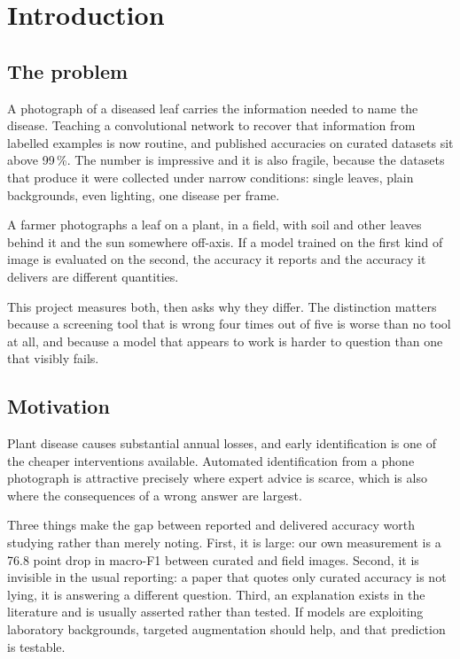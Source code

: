 
\chapter{Introduction}

\section{The problem}

A photograph of a diseased leaf carries the information needed to name the disease.
Teaching a convolutional network to recover that information from labelled examples
is now routine, and published accuracies on curated datasets sit above 99\,\%. The
number is impressive and it is also fragile, because the datasets that produce it
were collected under narrow conditions: single leaves, plain backgrounds, even
lighting, one disease per frame.

A farmer photographs a leaf on a plant, in a field, with soil and other leaves
behind it and the sun somewhere off-axis. If a model trained on the first kind of
image is evaluated on the second, the accuracy it reports and the accuracy it
delivers are different quantities.

This project measures both, then asks why they differ. The distinction matters
because a screening tool that is wrong four times out of five is worse than no tool
at all, and because a model that appears to work is harder to question than one that
visibly fails.

\section{Motivation}

Plant disease causes substantial annual losses, and early identification is one of
the cheaper interventions available. Automated identification from a phone
photograph is attractive precisely where expert advice is scarce, which is also
where the consequences of a wrong answer are largest.

Three things make the gap between reported and delivered accuracy worth studying
rather than merely noting. First, it is large: our own measurement is a 76.8 point
drop in macro-F1 between curated and field images. Second, it is invisible in the
usual reporting: a paper that quotes only curated accuracy is not lying, it is
answering a different question. Third, an explanation exists in the literature and
is usually asserted rather than tested. If models are exploiting laboratory
backgrounds, targeted augmentation should help, and that prediction is testable.


